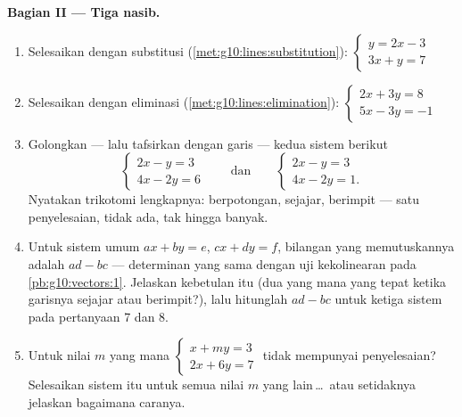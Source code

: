 \begin{problem}
\medskip
\noindent\textbf{Bagian II --- Tiga nasib.}
\begin{enumerate}[resume]
  \item Selesaikan dengan substitusi
        (\cref{met:g10:lines:substitution}):
        $\begin{cases} y = 2x - 3 \\ 3x + y = 7 \end{cases}$
  \item Selesaikan dengan eliminasi
        (\cref{met:g10:lines:elimination}):
        $\begin{cases} 2x + 3y = 8 \\ 5x - 3y = -1 \end{cases}$
  \item Golongkan --- lalu tafsirkan dengan garis --- kedua
        sistem berikut
        \[
        \begin{cases} 2x - y = 3 \\ 4x - 2y = 6 \end{cases}
        \qquad\text{dan}\qquad
        \begin{cases} 2x - y = 3 \\ 4x - 2y = 1 . \end{cases}
        \]
        Nyatakan trikotomi lengkapnya: berpotongan, sejajar,
        berimpit --- satu penyelesaian, tidak ada, tak hingga banyak.
  \item Untuk sistem umum $ax + by = e$, $cx + dy = f$,
        bilangan yang memutuskannya adalah $ad - bc$ --- determinan yang
        sama dengan uji kekolinearan pada
        \cref{pb:g10:vectors:1}. Jelaskan kebetulan itu (dua
         yang mana yang  tepat ketika garisnya
        sejajar atau berimpit?), lalu hitunglah $ad - bc$ untuk
        ketiga sistem pada pertanyaan 7 dan 8.
  \item Untuk nilai $m$ yang mana
        $\begin{cases} x + my = 3 \\ 2x + 6y = 7 \end{cases}$
        tidak mempunyai penyelesaian? Selesaikan sistem itu untuk semua nilai
        $m$ yang lain\,\dots\ atau setidaknya jelaskan bagaimana caranya.
\end{enumerate}


\end{problem}
